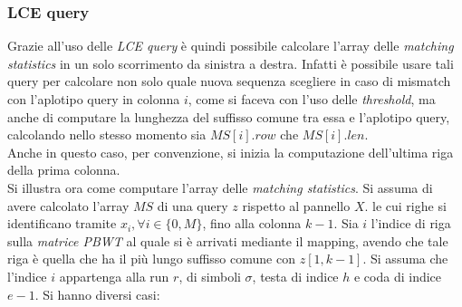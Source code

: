 \subsubsection{LCE query}
Grazie all'uso delle \textit{LCE query} è quindi possibile calcolare l'array
delle \textit{matching statistics} in un solo scorrimento da sinistra a
destra. Infatti è possibile usare tali query per calcolare non solo quale nuova
sequenza scegliere in caso di mismatch con l'aplotipo query in colonna $i$, come
si faceva con l'uso delle \textit{threshold}, ma anche di computare la lunghezza
del suffisso comune tra essa e l'aplotipo query, calcolando nello stesso momento
sia $MS[i].row$ che $MS[i].len$.\\
Anche in questo caso, per convenzione, si inizia la computazione dell'ultima
riga della prima colonna.\\
Si illustra ora come computare l'array delle \textit{matching statistics}.
Si assuma di avere calcolato l'array $MS$ di una query $z$ rispetto al pannello
$X$. le cui righe si identificano tramite $x_i, \forall i\in\{0,M\}$, fino alla
colonna $k-1$. Sia $i$ 
l'indice di riga sulla \textit{matrice PBWT} al quale si è arrivati mediante il
mapping, avendo che tale riga è quella che ha il più lungo suffisso comune con
$z[1,k-1]$. Si assuma che l'indice $i$ appartenga alla run $r$, di simboli
$\sigma$, testa di indice $h$ e coda di indice $e-1$. Si hanno diversi casi:
